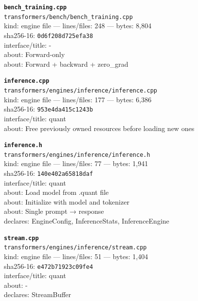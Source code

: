 \noindent\textbf{\texttt{bench\_training.cpp}}\\
\texttt{transformers/bench/bench\_training.cpp}\\
kind: engine file --- lines/files: 248 --- bytes: 8,804\\
sha256-16: \texttt{0d6f208d725efa38}\\
interface/title: -\\
about: Forward-only\\
about: Forward + backward + zero\_grad\\
\vspace*{6.0pt}

\noindent\textbf{\texttt{inference.cpp}}\\
\texttt{transformers/engines/inference/inference.cpp}\\
kind: engine file --- lines/files: 177 --- bytes: 6,386\\
sha256-16: \texttt{953e4da415c1243b}\\
interface/title: quant\\
about: Free previously owned resources before loading new ones\\
\vspace*{6.0pt}

\noindent\textbf{\texttt{inference.h}}\\
\texttt{transformers/engines/inference/inference.h}\\
kind: engine file --- lines/files: 77 --- bytes: 1,941\\
sha256-16: \texttt{140e402a65818daf}\\
interface/title: quant\\
about: Load model from .quant file\\
about: Initialize with model and tokenizer\\
about: Single prompt → response\\
declares: EngineConfig, InferenceStats, InferenceEngine\\
\vspace*{6.0pt}

\noindent\textbf{\texttt{stream.cpp}}\\
\texttt{transformers/engines/inference/stream.cpp}\\
kind: engine file --- lines/files: 51 --- bytes: 1,404\\
sha256-16: \texttt{e472b71923c09fe4}\\
interface/title: quant\\
about: -\\
declares: StreamBuffer\\
\vspace*{6.0pt}
\newpage

